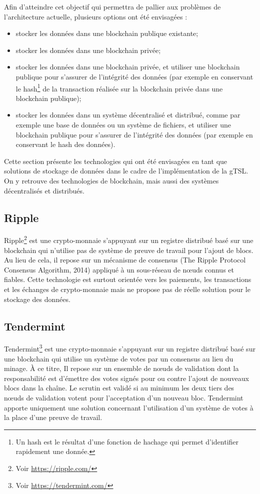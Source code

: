 \documentclass{tnreport}
\begin{document}
Afin d'atteindre cet objectif qui permettra de pallier aux problèmes de l'architecture actuelle, plusieurs options ont été envisagées :
\begin{itemize}
	\item stocker les données dans une blockchain publique existante;
	\item stocker les données dans une blockchain privée;
	\item stocker les données dans une blockchain privée, et utiliser une blockchain publique pour s'assurer de l'intégrité des données (par exemple en conservant le hash\footnote{Un hash est le résultat d'une fonction de hachage qui permet d'identifier rapidement une donnée.} de la transaction réalisée sur la blockchain privée dans une blockchain publique);
	\item stocker les données dans un système décentralisé et distribué, comme par exemple une base de données ou un système de fichiers, et utiliser une blockchain publique pour s'assurer de l'intégrité des données (par exemple en conservant le hash des données).
	\newline
\end{itemize}

Cette section présente les technologies qui ont été envisagées en tant que solutions de stockage de données dans le cadre de l'implémentation de la gTSL. On y retrouve des technologies de blockchain, mais aussi des systèmes décentralisés et distribués.

\subsection{Ripple}

Ripple\footnote{Voir \url{https://ripple.com/}} est une crypto-monnaie s'appuyant sur un registre distribué basé sur une blockchain qui n'utilise pas de système de preuve de travail pour l'ajout de blocs. Au lieu de cela, il repose sur un mécanisme de consensus (The Ripple Protocol Consensus Algorithm, 2014) appliqué à un sous-réseau de nœuds connus et fiables. Cette technologie est surtout orientée vers les paiements, les transactions et les échanges de crypto-monnaie mais ne propose pas de réelle solution pour le stockage des données.

\subsection{Tendermint}

Tendermint\footnote{Voir \url{https://tendermint.com/}} est une crypto-monnaie s'appuyant sur un registre distribué basé sur une blockchain qui utilise un système de votes par un consensus au lieu du minage. À ce titre, Il repose sur un ensemble de nœuds de validation dont la responsabilité est d'émettre des votes signés pour ou contre l'ajout de nouveaux blocs dans la chaîne. Le scrutin est validé si au minimum les deux tiers des nœuds de validation votent pour l'acceptation d'un nouveau bloc. Tendermint apporte uniquement une solution concernant l'utilisation d'un système de votes à la place d'une preuve de travail.
\end{document}
